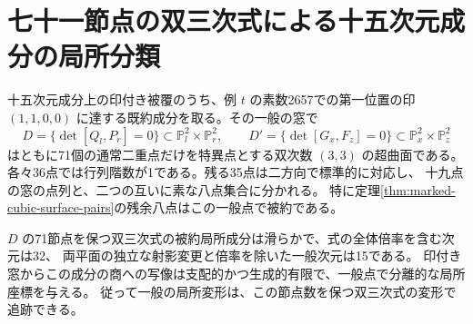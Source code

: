 \section{七十一節点の双三次式による十五次元成分の局所分類}
\label{sec:marked-bicubic-nodes}
\begin{theorem}\label{thm:marked-bicubic-nodes}
十五次元成分上の印付き被覆のうち、例 $t$ の素数2657での第一位置の印
$(1,1,0,0)$ に達する既約成分を取る。その一般の窓で
\[
 D=\{\det[Q_l,P_r]=0\}\subset\mathbb P^2_l\times\mathbb P^2_r,\qquad
 D'=\{\det[G_x,F_z]=0\}\subset\mathbb P^2_x\times\mathbb P^2_z
\]
はともに71個の通常二重点だけを特異点とする双次数 $(3,3)$ の超曲面である。
各々36点では行列階数が1である。残る35点は二方向で標準的に対応し、
十九点の窓の点列と、二つの互いに素な八点集合に分かれる。
特に定理\ref{thm:marked-cubic-surface-pairs}の残余八点はこの一般点で被約である。

$D$ の71節点を保つ双三次式の被約局所成分は滑らかで、式の全体倍率を含む次元は32、
両平面の独立な射影変更と倍率を除いた一般次元は15である。
印付き窓からこの成分の商への写像は支配的かつ生成的有限で、一般点で分離的な局所座標を与える。
従って一般の局所変形は、この節点数を保つ双三次式の変形で追跡できる。
\end{theorem}

